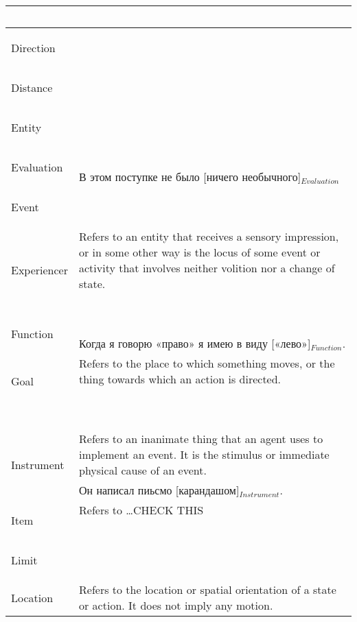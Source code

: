 \documentclass[a4paper,11pt, onecolumn,twoside]{article}
\begin{document}
\begin{longtable}{ p{}  p{} }
        & ~ \\
\midrule
 \multirow{2}{*}{Direction} & ~ \\ 
        & ~ \\
\midrule
 \multirow{2}{*}{Distance} & ~ \\ 
        & ~ \\
\midrule
 \multirow{2}{*}{Entity} & ~ \\ 
        & ~ \\
\midrule
 \multirow{2}{*}{Evaluation} & ~ \\  
        & В этом поступке не было [ничего необычного]$_{Evaluation}$ \\
\midrule
 \multirow{2}{*}{Event} & ~ \\ 
        & ~ \\
\midrule
 \multirow{2}{*}{Experiencer} & Refers to an entity that receives a sensory impression, or in some other way is the locus of some event or activity that involves neither volition nor a change of state. \\ 
        & ~ \\
\midrule
 \multirow{2}{*}{Function} & ~ \\ 
        & Когда я говорю «право» я имею в виду [«лево»]$_{Function}$. \\
\midrule
 \multirow{2}{*}{Goal} & Refers to the place to which something moves, or the thing towards which an action is directed. \\ 
\midrule
 \multirow{2}{*}{Goer} & ~ \\ 
        & ~ \\
\midrule
 \multirow{2}{*}{Instrument} & Refers to an inanimate thing that an agent uses to implement an event. It is the stimulus or immediate physical cause of an event. \\ 
        & Он написал пиьсмо [карандашом]$_{Instrument}$. \\
\midrule
 \multirow{2}{*}{Item} & Refers to \ldots CHECK THIS \\ 
        & ~ \\
\midrule
 \multirow{2}{*}{Limit} &  ~ \\
        & ~ \\
\midrule
 \multirow{2}{*}{Location} & Refers to the location or spatial orientation of a state or action. It does not imply any motion. \\ 

\end{longtable}
\end{document}
